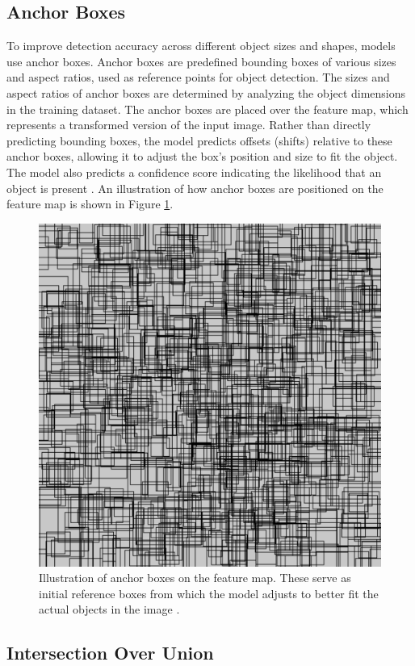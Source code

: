 \subsection{Anchor Boxes}

To improve detection accuracy across different object sizes and shapes, models use anchor boxes. Anchor boxes are predefined bounding boxes of various sizes and aspect ratios, used as reference points for object detection. The sizes and aspect ratios of anchor boxes are determined by analyzing the object dimensions in the training dataset. The anchor boxes are placed over the feature map, which represents a transformed version of the input image. Rather than directly predicting bounding boxes, the model predicts offsets (shifts) relative to these anchor boxes, allowing it to adjust the box's position and size to fit the object. The model also predicts a confidence score indicating the likelihood that an object is present \cite{thinkautonomous:anchorboxes}. An illustration of how anchor boxes are positioned on the feature map is shown in Figure \ref{fig:anchor-box}.

\begin{figure}[h!]
    \centering
    \includegraphics[width=0.7\linewidth]{figures/theory/image-recognition/anchor-boxes.png}
    \caption[Anchor boxes in object detection]{Illustration of anchor boxes on the feature map. These serve as initial reference boxes from which the model adjusts to better fit the actual objects in the image \cite{thinkautonomous:anchorboxes}.}
    \label{fig:anchor-box}
\end{figure}

\subsection{Intersection Over Union}

